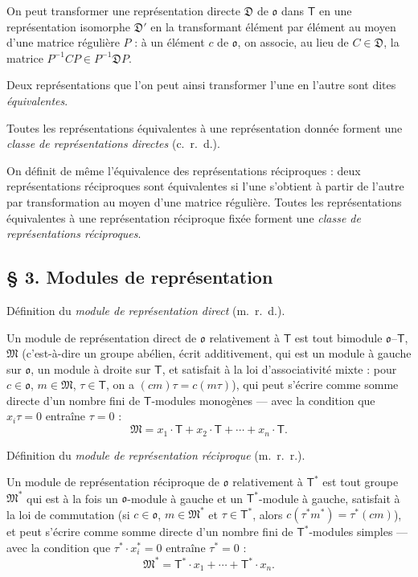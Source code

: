 On peut transformer une représentation directe $\mathfrak D$ de $\mathfrak{o}$ dans $\mathsf T$ en une représentation isomorphe $\mathfrak D'$ en la transformant élément par élément au moyen d'une matrice régulière $P$ : à un élément $c$ de $\mathfrak{o}$, on associe, au lieu de $C\in\mathfrak D$, la matrice $P^{-1}CP\in P^{-1}\mathfrak D P$.

Deux représentations que l'on peut ainsi transformer l'une en l'autre sont dites \emph{équivalentes}.

Toutes les représentations équivalentes à une représentation donnée forment une \emph{classe de représentations directes} (c.\ r.\ d.).

On définit de même l'équivalence des représentations réciproques : deux représentations réciproques sont équivalentes si l'une s'obtient à partir de l'autre par transformation au moyen d'une matrice régulière. Toutes les représentations équivalentes à une représentation réciproque fixée forment une \emph{classe de représentations réciproques}.

\subsection*{\S{} 3. Modules de représentation}\label{fr-r823-modules-representation}

Définition du \emph{module de représentation direct} (m.\ r.\ d.).

Un module de représentation direct de $\mathfrak{o}$ relativement à $\mathsf T$ est tout bimodule $\mathfrak{o}$--$\mathsf T$, $\mathfrak M$ (c'est-à-dire un groupe abélien, écrit additivement, qui est un module à gauche sur $\mathfrak{o}$, un module à droite sur $\mathsf T$, et satisfait à la loi d'associativité mixte : pour $c\in\mathfrak{o}$, $m\in\mathfrak M$, $\tau\in\mathsf T$, on a $(cm)\tau=c(m\tau)$), qui peut s'écrire comme somme directe d'un nombre fini de $\mathsf T$-modules monogènes --- avec la condition que $x_i\tau=0$ entraîne $\tau=0$ :
\[
\mathfrak M=x_1\cdot\mathsf T+x_2\cdot\mathsf T+\cdots+x_n\cdot\mathsf T.
\]

Définition du \emph{module de représentation réciproque} (m.\ r.\ r.).

Un module de représentation réciproque de $\mathfrak{o}$ relativement à $\mathsf T^*$ est tout groupe $\mathfrak M^*$ qui est à la fois un $\mathfrak{o}$-module à gauche et un $\mathsf T^*$-module à gauche, satisfait à la loi de commutation (si $c\in\mathfrak{o}$, $m\in\mathfrak M^*$ et $\tau\in\mathsf T^*$, alors $c(\tau^*m^*)=\tau^*(cm)$), et peut s'écrire comme somme directe d'un nombre fini de $\mathsf T^*$-modules simples --- avec la condition que $\tau^*\cdot x_i^*=0$ entraîne $\tau^*=0$ :
\[
\mathfrak M^*=\mathsf T^*\cdot x_1+\cdots+\mathsf T^*\cdot x_n.
\]


